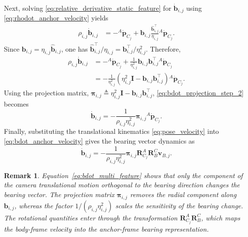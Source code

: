 \documentclass[journal]{IEEEtran}
\newtheorem{remark}{Remark}[section]
\begin{document}
Next, solving \eqref{eq:relative_derivative_static_feature} for
$\dot{\bm{b}}_{i,j}$ using \eqref{eq:rhodot_anchor_velocity} yields
\begin{align}
  \rho_{i,j}\dot{\bm{b}}_{i,j}
  &=
  -{}^{A}\dot{\bm{p}}_{C_j}
  +
  \bm{b}_{i,j}
  \frac{\hat{\bm{b}}_{i,j}^{\top}}{\eta_{i,j}}
  {}^{A}\dot{\bm{p}}_{C_j}.
  \label{eq:bdot_projection_step_1}
\end{align}
Since $\bm{b}_{i,j}=\eta_{i,j}\hat{\bm{b}}_{i,j}$, one has
$\hat{\bm{b}}_{i,j}^{\top}/\eta_{i,j}
=
\bm{b}_{i,j}^{\top}/\eta_{i,j}^{2}$. Therefore,
\begin{align}
  \rho_{i,j}\dot{\bm{b}}_{i,j}
  &=
  -{}^{A}\dot{\bm{p}}_{C_j}
  +
  \frac{1}{\eta_{i,j}^{2}}
  \bm{b}_{i,j}\bm{b}_{i,j}^{\top}
  {}^{A}\dot{\bm{p}}_{C_j} \nonumber\\
  &=
  -\frac{1}{\eta_{i,j}^{2}}
  \left(
  \eta_{i,j}^{2}\bm{I}
  -
  \bm{b}_{i,j}\bm{b}_{i,j}^{\top}
  \right)
  {}^{A}\dot{\bm{p}}_{C_j}.
  \label{eq:bdot_projection_step_2}
\end{align}
Using the projection matrix, $\bm{\pi}_{i,j} \triangleq \eta_{i,j}^{2}\bm{I} -\bm{b}_{i,j}\bm{b}_{i,j}^{\top}$, \eqref{eq:bdot_projection_step_2} becomes
\begin{equation}
  \dot{\bm{b}}_{i,j}
  =
  -\frac{1}{\rho_{i,j}\eta_{i,j}^{2}}
  \bm{\pi}_{i,j}
  {}^{A}\dot{\bm{p}}_{C_j}.
  \label{eq:bdot_anchor_velocity}
\end{equation}
Finally, substituting the translational kinematics
\eqref{eq:pose_velocity} into \eqref{eq:bdot_anchor_velocity} gives the
bearing vector dynamics as
\begin{equation}
  \dot{\bm{b}}_{i,j}
  =
  -\frac{1}{\rho_{i,j}\eta_{i,j}^{2}}
  \bm{\pi}_{i,j}\bm{R}_{C_j}^{A}\bm{R}_{B}^{C}\bm{v}_{B,j}.
  \label{eq:bdot_multi_feature}
\end{equation}

\begin{remark}
Equation~\eqref{eq:bdot_multi_feature} shows that only the component of the
camera translational motion orthogonal to the bearing direction changes the
bearing vector. The projection matrix $\bm{\pi}_{i,j}$ removes the radial
component along $\bm{b}_{i,j}$, whereas the factor
$1/(\rho_{i,j}\eta_{i,j}^{2})$ scales the sensitivity of the bearing change.
The rotational quantities enter through the transformation
$\bm{R}_{C_j}^{A}\bm{R}_{B}^{C}$, which maps the body-frame velocity into the
anchor-frame bearing representation.
\end{remark}
\end{document}
